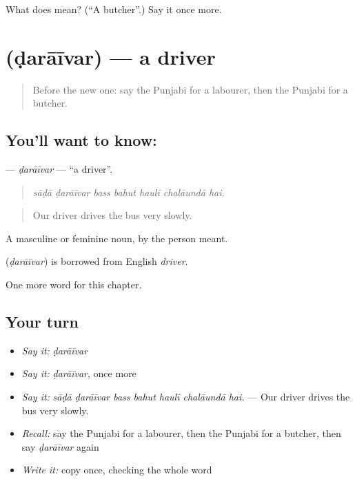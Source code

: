 \begin{tcolorbox}[breakable,colback=teal!4,colframe=teal!35!black,title={Before you move on}]
What does  mean? (\textquotedblleft{}A butcher\textquotedblright{}.) Say it once more.
\end{tcolorbox}
\section[\texorpdfstring{\pa{ਡਰਾਈਵਰ} (ḍarāīvar)}{ਡਰਾਈਵਰ (ḍarāīvar)}]{ (ḍarāīvar) — a driver}

\label{lesson:PA-C336-daraivar}



\begin{quote}
Before the new one: say the Punjabi for a labourer, then the Punjabi for a butcher.
\end{quote}

\subsection*{You'll want to know: }
\textbf{} — \emph{ḍarāīvar} — \textquotedblleft{}a driver\textquotedblright{}.

\begin{quote}
      
\end{quote}

\begin{quote}
\emph{sāḍā ḍarāīvar bass bahut haulī chalāundā hai.}
\end{quote}

\begin{quote}
Our driver drives the bus very slowly.
\end{quote}

A masculine or feminine noun, by the person meant.

\begin{cousinweb}
\textbf{} (\emph{ḍarāīvar}) is borrowed from English \emph{driver}.
\end{cousinweb}

\begin{grammarlens}[title={What you've built}]
One more word for this chapter.
\end{grammarlens}

\subsection*{Your turn}
\begin{itemize}
\raggedright
  \item \emph{Say it:} \emph{ḍarāīvar}
  \item \emph{Say it:} \emph{ḍarāīvar}, once more
  \item \emph{Say it:} \emph{sāḍā ḍarāīvar bass bahut haulī chalāundā hai.} — Our driver drives the bus very slowly.
  \item \emph{Recall:} say the Punjabi for a labourer, then the Punjabi for a butcher, then say \emph{ḍarāīvar} again
  \item \emph{Write it:} copy \textbf{} once, checking the whole word
\end{itemize}


